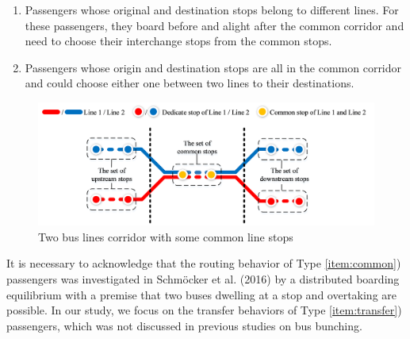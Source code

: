\documentclass[smallextended]{svjour3}       %
\begin{document}
\begin{Abstract}
\begin{enumerate}[Type I)]
    \item \label{item:transfer}Passengers whose original and destination stops belong to different lines. 
    For these passengers, they board before and alight after the common corridor and need to choose their interchange stops from the common stops.
    \item \label{item:common}Passengers whose origin and destination stops are all in the common corridor 
    and could choose either one between two lines to their destinations.
\end{enumerate}

\begin{figure}[H] 
  \centering 
  \includegraphics[width=0.9\linewidth]{CASPT2021paper_fig/Fig1.png} 
  \caption{Two bus lines corridor with some common line stops} 
  \label{fig:Fig1} 
\end{figure}

It is necessary to acknowledge that the routing behavior of Type \ref{item:common}) passengers was investigated 
in \textrm{Schmöcker et al. (2016)} by a distributed boarding equilibrium with a premise that two buses dwelling at a stop and overtaking are possible.
In our study, we focus on the transfer behaviors of Type \ref{item:transfer}) passengers, which was not discussed in previous studies on bus bunching.




\end{Abstract}
\end{document}
